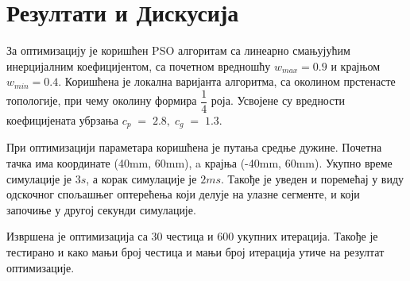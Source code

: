 \documentclass[12pt]{article}
\begin{document}
\newpage
\section{Резултати и Дискусија}
За оптимизацију је коришћен PSO алгоритам са линеарно смањујућим инерцијалним коефицијентом, са почетном вредношћу $w_{max}=0.9$ и крајњом $w_{min}=0.4$. Коришћена је локална варијанта алгоритма, са околином прстенасте топологије, при чему околину формира $\dfrac{1}{4}$ роја. Усвојене су вредности коефицијената убрзања $c_p\;=\;2.8,\;c_g\;=\;1.3$.

При оптимизацији параметара коришћена је путања средње дужине. Почетна тачка има координате (40mm, 60mm), a крајња (-40mm, 60mm).
Укупно време симулације је $3 s$, а корак симулације је $2 ms$. Такође је уведен и поремећај у виду одскочног спољашњег оптерећења који делује на улазне сегменте, и који започиње у другој секунди симулације.

Извршена је оптимизација са 30 честица и 600 укупних итерација. Такође је тестирано и како мањи број честица и мањи број итерација утиче на резултат оптимизације.
\end{document}
